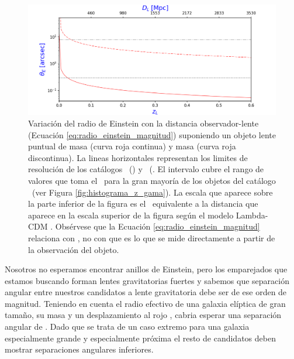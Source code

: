 \begin{figure}[H]
  \begin{center}
    \includegraphics[scale=0.8]{5_HALOS/radio_einstein.png}
      \caption{\small Variación del radio de Einstein con la distancia observador-lente (Ecuación \ref{eq:radio_einstein_magnitud}) suponiendo un objeto lente puntual de masa (curva roja continua) y masa (curva roja discontinua). La lineas horizontales representan los limites de resolución de los catálogos \hatlas\ () y \gama\  (. El intervalo  cubre el rango de valores que toma el \rt\ para la gran mayoría de los objetos del catálogo \gama\ (ver Figura \ref{fig:histograma_z_gama}). La escala que aparece sobre la parte inferior de la figura es el \rt\ equivalente a la distancia que aparece en la escala superior de la figura según el modelo Lambda-CDM \footnotemark. Obsérvese que la Ecuación \ref{eq:radio_einstein_magnitud} relaciona  con , no con  que es lo que se mide directamente a partir de la observación del objeto.}
  \label{fig:radio_einstein}
  \end{center}
\end{figure}

Nosotros no esperamos encontrar anillos de Einstein, pero los emparejados que estamos buscando forman lentes gravitatorias fuertes y sabemos que separación angular entre nuestros candidatos a lente gravitatoria debe ser de ese orden de magnitud. Teniendo en cuenta el radio efectivo de una galaxia elíptica de gran tamaño, su masa y un desplazamiento al rojo , cabria esperar una separación angular de . Dado que se trata de un caso extremo para una galaxia especialmente grande y especialmente próxima el resto de candidatos deben mostrar separaciones angulares inferiores.

